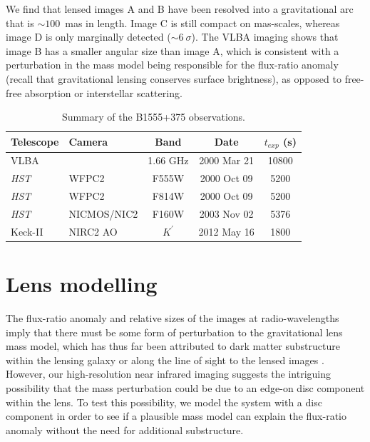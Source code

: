 \documentclass[a4paper,fleqn,usenatbib,useAMS]{mnras}
\begin{document}
We find that lensed images A and B have been resolved into a gravitational arc that is $\sim100$~mas in length. Image C is still compact on mas-scales, whereas image D is only marginally detected ($\sim6~\sigma$). 
The VLBA imaging shows that image B has a smaller angular size than image A, which is consistent with a perturbation in the mass model being responsible for the flux-ratio anomaly (recall that gravitational lensing conserves surface brightness), as opposed to free-free absorption or interstellar scattering.

\begin{table}
\centering
\caption{Summary of the B1555+375 observations.}
\begin{tabular}{llccc}
\hline
Telescope		& Camera			&  Band 		& Date				&$t_{exp}$ (s) \\
\hline
VLBA			&					& 1.66 GHz	& 	2000 Mar 21	& 10800\\
\textit{HST}	& WFPC2    		& F555W		&	2000 Oct 09	& 5200\\
\textit{HST}	& WFPC2    		& F814W		&	2000 Oct 09 	& 5200\\
\textit{HST}	& NICMOS/NIC2	& F160W		&	2003 Nov 02	& 5376\\
Keck-II			& NIRC2 AO		& $K^\prime$	& 	2012 May 16	& 1800\\
\hline
\end{tabular}
\label{tab:obs}
\end{table}

\section{Lens modelling}

The flux-ratio anomaly and relative sizes of the images at radio-wavelengths imply that there must be some form of perturbation to the gravitational lens mass model, which has thus far been attributed to dark matter substructure within the lensing galaxy or along the line of sight to the lensed images \citep{Dalal2002,Xu12,Xu15}. However, our high-resolution near infrared imaging suggests the intriguing possibility that the mass perturbation could be due to an edge-on disc component within the lens. To test this possibility, we model the system with a disc component in order to see if a plausible mass model can explain the flux-ratio anomaly without the need for additional substructure.
\end{document}
